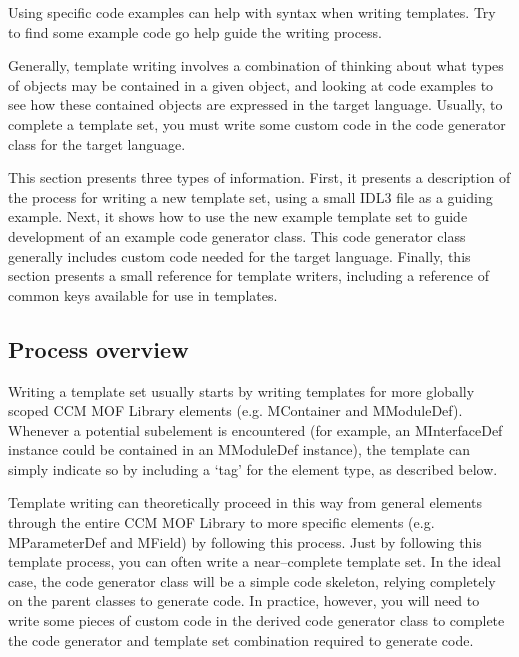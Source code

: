 Using specific code examples can help with syntax when writing templates. Try to
find some example code go help guide the writing process.

Generally, template writing involves a combination of thinking about what types
of objects may be contained in a given object, and looking at code examples to
see how these contained objects are expressed in the target language. Usually,
to complete a template set, you must write some custom code in the code
generator class for the target language.

This section presents three types of information. First, it presents a
description of the process for writing a new template set, using a small IDL3
file as a guiding example. Next, it shows how to use the new example template
set to guide development of an example code generator class. This code generator
class generally includes custom code needed for the target language. Finally,
this section presents a small reference for template writers, including a
reference of common keys available for use in templates.

\subsection{Process overview}

Writing a template set usually starts by writing templates for more globally
scoped CCM MOF Library elements (e.g. MContainer and MModuleDef). Whenever a
potential subelement is encountered (for example, an MInterfaceDef instance
could be contained in an MModuleDef instance), the template can simply indicate
so by including a `tag' for the element type, as described below.

Template writing can theoretically proceed in this way from general elements
through the entire CCM MOF Library to more specific elements (e.g. MParameterDef
and MField) by following this process. Just by following this template process,
you can often write a near--complete template set. In the ideal case, the code
generator class will be a simple code skeleton, relying completely on the parent
classes to generate code. In practice, however, you will need to write some
pieces of custom code in the derived code generator class to complete the code
generator and template set combination required to generate code.

